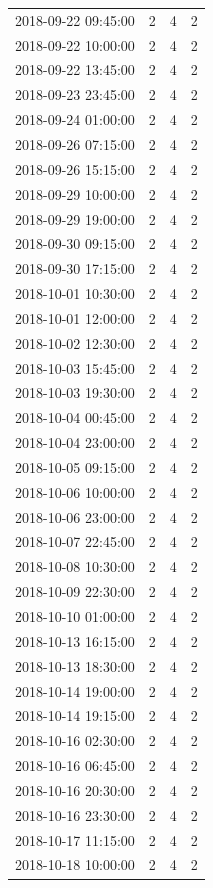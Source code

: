 \begin{tabular}{lrrr}
2018-09-22 09:45:00 & 2 & 4 & 2 \\
2018-09-22 10:00:00 & 2 & 4 & 2 \\
2018-09-22 13:45:00 & 2 & 4 & 2 \\
2018-09-23 23:45:00 & 2 & 4 & 2 \\
2018-09-24 01:00:00 & 2 & 4 & 2 \\
2018-09-26 07:15:00 & 2 & 4 & 2 \\
2018-09-26 15:15:00 & 2 & 4 & 2 \\
2018-09-29 10:00:00 & 2 & 4 & 2 \\
2018-09-29 19:00:00 & 2 & 4 & 2 \\
2018-09-30 09:15:00 & 2 & 4 & 2 \\
2018-09-30 17:15:00 & 2 & 4 & 2 \\
2018-10-01 10:30:00 & 2 & 4 & 2 \\
2018-10-01 12:00:00 & 2 & 4 & 2 \\
2018-10-02 12:30:00 & 2 & 4 & 2 \\
2018-10-03 15:45:00 & 2 & 4 & 2 \\
2018-10-03 19:30:00 & 2 & 4 & 2 \\
2018-10-04 00:45:00 & 2 & 4 & 2 \\
2018-10-04 23:00:00 & 2 & 4 & 2 \\
2018-10-05 09:15:00 & 2 & 4 & 2 \\
2018-10-06 10:00:00 & 2 & 4 & 2 \\
2018-10-06 23:00:00 & 2 & 4 & 2 \\
2018-10-07 22:45:00 & 2 & 4 & 2 \\
2018-10-08 10:30:00 & 2 & 4 & 2 \\
2018-10-09 22:30:00 & 2 & 4 & 2 \\
2018-10-10 01:00:00 & 2 & 4 & 2 \\
2018-10-13 16:15:00 & 2 & 4 & 2 \\
2018-10-13 18:30:00 & 2 & 4 & 2 \\
2018-10-14 19:00:00 & 2 & 4 & 2 \\
2018-10-14 19:15:00 & 2 & 4 & 2 \\
2018-10-16 02:30:00 & 2 & 4 & 2 \\
2018-10-16 06:45:00 & 2 & 4 & 2 \\
2018-10-16 20:30:00 & 2 & 4 & 2 \\
2018-10-16 23:30:00 & 2 & 4 & 2 \\
2018-10-17 11:15:00 & 2 & 4 & 2 \\
2018-10-18 10:00:00 & 2 & 4 & 2 \\

\end{tabular}
